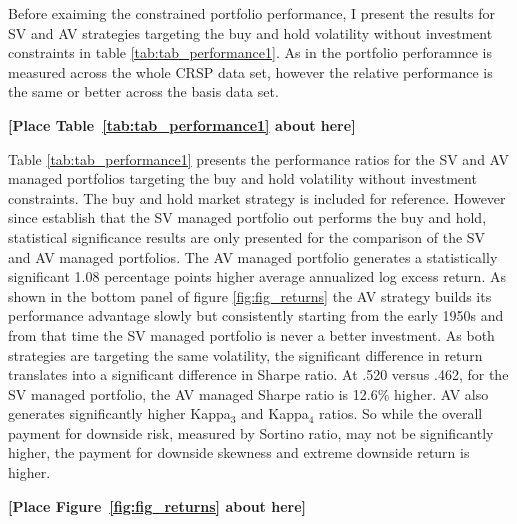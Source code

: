 Before exaiming the constrained portfolio performance, I present the results for SV and AV strategies targeting the buy and hold volatility without investment constraints in table \ref{tab:tab_performance1}. As in \citet{moreira_volatility-managed_2017} the portfolio perforamnce is measured across the whole CRSP data set, however the relative performance is the same or better across the basis data set. 

\bigskip
\centerline{\bf [Place Table~\ref{tab:tab_performance1} about here]}
\bigskip

Table \ref{tab:tab_performance1} presents the performance ratios for the SV and AV managed portfolios targeting the buy and hold volatility without investment constraints. The buy and hold market strategy is included for reference. However since \citet{moreira_volatility-managed_2017} establish that the SV managed portfolio out performs the buy and hold, statistical significance results are only presented for the comparison of the SV and AV managed portfolios. The AV managed portfolio generates a statistically significant 1.08 percentage points higher average annualized log excess return. As shown in the bottom panel of figure \ref{fig:fig_returns} the AV strategy builds its performance advantage slowly but consistently starting from the early 1950s and from that time the SV managed portfolio is never a better investment. As both strategies are targeting the same volatility, the significant difference in return translates into a significant difference in Sharpe ratio. At .520 versus .462, for the SV managed portfolio, the AV managed Sharpe ratio is 12.6\% higher. AV also generates significantly higher Kappa$_{3}$ and Kappa$_{4}$ ratios. So while the overall payment for downside risk, measured by Sortino ratio, may not be significantly higher, the payment for downside skewness and extreme downside return is higher. %

\bigskip
\centerline{\bf [Place Figure~\ref{fig:fig_returns} about here]}
\bigskip

